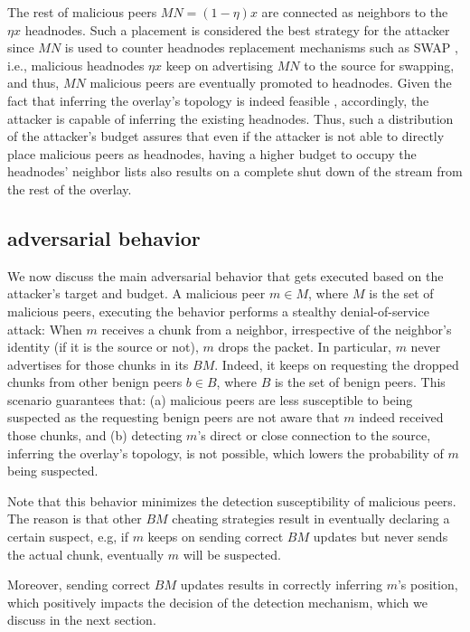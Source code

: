 The rest of malicious peers $MN=(1-\eta) x$ are connected as neighbors to the $\eta x$ headnodes. 
Such a placement is considered the best strategy for the attacker since $MN$ is used to counter headnodes replacement mechanisms such as SWAP \cite{nguyen2016swap}, i.e., malicious headnodes $\eta x$ keep on advertising $MN$ to the source for swapping, and thus, $MN$ malicious peers are eventually promoted to headnodes. 
Given the fact that inferring the overlay's topology is indeed feasible \cite{nguyen2016swap,rbcs}, accordingly, the attacker is capable of inferring the existing headnodes.
Thus, such a distribution of the attacker's budget assures that even if the attacker is not able to directly place malicious peers as headnodes, having a higher budget to occupy the headnodes' neighbor lists also results on a complete shut down of the stream from the rest of the overlay.



\subsection{\drop adversarial behavior}
We now discuss the main adversarial behavior that gets executed based on the attacker's target and budget. 
A malicious peer $m \in M$, where $M$ is the set of malicious peers, executing the \drop behavior performs a stealthy denial-of-service attack: 
When $m$ receives a chunk from a neighbor, irrespective of the neighbor's identity (if it is the source or not), $m$ drops the packet.
In particular, $m$ never advertises for those chunks in its $BM$.
Indeed, it keeps on requesting the dropped chunks from other benign peers $b \in B$, where $B$ is the set of benign peers.
This scenario guarantees that: (a) malicious peers are less susceptible to being suspected as the requesting benign peers are not aware that $m$ indeed received those chunks,
and (b) detecting $m$'s direct or close connection to the source, inferring the overlay's topology, is not possible, which lowers the probability of $m$ being suspected.


Note that this behavior minimizes the detection susceptibility of malicious peers.
The reason is that other $BM$ cheating strategies result in eventually declaring a certain suspect, e.g, if $m$ keeps on sending correct $BM$ updates but never sends the actual chunk, eventually $m$ will be suspected.

Moreover, sending correct $BM$ updates results in correctly inferring $m$'s position, which positively impacts the decision of the detection mechanism, which we discuss in the next section. 





